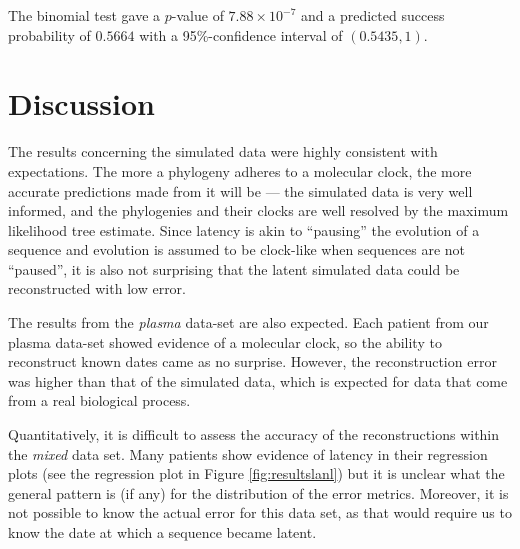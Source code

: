 \documentclass[12pt]{article}
\begin{document}
The binomial test gave a $p$-value of $7.88 \times 10^{-7}$ and a predicted success probability of $0.5664$ with a 95\%-confidence interval of $(0.5435, 1)$.


\section * {Discussion} \label{sec:discuss}

The results concerning the simulated data were highly consistent with expectations. 
The more a phylogeny adheres to a molecular clock, the more accurate predictions made from it will be --- the simulated data is very well informed, and the phylogenies and their clocks are well resolved by the maximum likelihood tree estimate. 
Since latency is akin to ``pausing'' the evolution of a sequence and evolution is assumed to be clock-like when sequences are not ``paused'', it is also not surprising that the latent simulated data could be reconstructed with low error. 

The results from the {\em plasma} data-set are also expected. 
Each patient from our plasma data-set showed evidence of a molecular clock, so the ability to reconstruct known dates came as no surprise. 
However, the reconstruction error was higher than that of the simulated data, which is expected for data that come from a real biological process.

Quantitatively, it is difficult to assess the accuracy of the reconstructions within the {\em mixed} data set. 
Many patients show evidence of latency in their regression plots (see the regression plot in Figure \ref{fig:resultslanl}) but it is unclear what the general pattern is (if any) for the distribution of the error metrics. 
Moreover, it is not possible to know the actual error for this data set, as that would require us to know the date at which a sequence became latent. 
\end{document}
